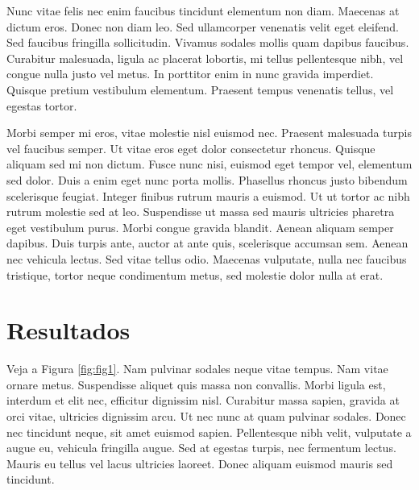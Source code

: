 \documentclass[book,A4paper,10pt,twoside,oldfontcommands]{memoir}\usepackage[]{graphicx}\usepackage[usenames,dvipsnames]{color}
\begin{document}
Nunc vitae felis nec enim faucibus tincidunt elementum non diam.
Maecenas at dictum eros. Donec non diam leo. Sed ullamcorper venenatis
velit eget eleifend. Sed faucibus fringilla sollicitudin. Vivamus
sodales mollis quam dapibus faucibus. Curabitur malesuada, ligula ac
placerat lobortis, mi tellus pellentesque nibh, vel congue nulla justo
vel metus. In porttitor enim in nunc gravida imperdiet. Quisque
pretium vestibulum elementum. Praesent tempus venenatis tellus, vel
egestas tortor. 

Morbi semper mi eros, vitae molestie nisl euismod nec. Praesent
malesuada turpis vel faucibus semper. Ut vitae eros eget dolor
consectetur rhoncus. Quisque aliquam sed mi non dictum. Fusce nunc
nisi, euismod eget tempor vel, elementum sed dolor. Duis a enim eget
nunc porta mollis. Phasellus rhoncus justo bibendum scelerisque
feugiat. Integer finibus rutrum mauris a euismod. Ut ut tortor ac nibh
rutrum molestie sed at leo. Suspendisse ut massa sed mauris ultricies
pharetra eget vestibulum purus. Morbi congue gravida blandit. Aenean
aliquam semper dapibus. Duis turpis ante, auctor at ante quis,
scelerisque accumsan sem. Aenean nec vehicula lectus. Sed vitae tellus
odio. Maecenas vulputate, nulla nec faucibus tristique, tortor neque
condimentum metus, sed molestie dolor nulla at erat.



\chapter{Resultados}



Veja a Figura \ref{fig:fig1}. Nam pulvinar sodales neque vitae tempus.
Nam vitae ornare metus. Suspendisse aliquet quis massa non convallis.
Morbi ligula est, interdum et elit nec, efficitur dignissim nisl.
Curabitur massa sapien, gravida at orci vitae, ultricies dignissim arcu.
Ut nec nunc at quam pulvinar sodales. Donec nec tincidunt neque, sit
amet euismod sapien. Pellentesque nibh velit, vulputate a augue eu,
vehicula fringilla augue. Sed at egestas turpis, nec fermentum lectus.
Mauris eu tellus vel lacus ultricies laoreet. Donec aliquam euismod
mauris sed tincidunt.

\end{document}

